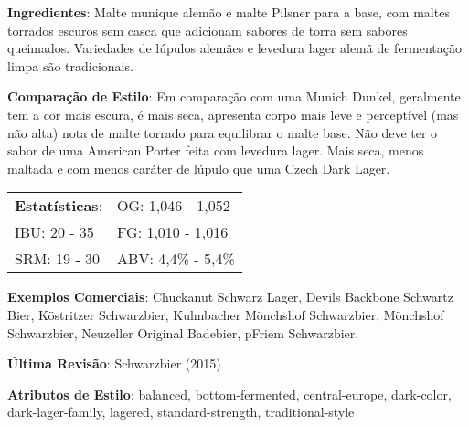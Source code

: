 \textbf{Ingredientes}: Malte munique alemão e malte Pilsner para a base, com maltes torrados escuros sem casca que adicionam sabores de torra sem sabores queimados. Variedades de lúpulos alemães e levedura lager alemã de fermentação limpa são tradicionais.

\textbf{Comparação de Estilo}: Em comparação com uma Munich Dunkel, geralmente tem a cor mais escura, é mais seca, apresenta corpo mais leve e perceptível (mas não alta) nota de malte torrado para equilibrar o malte base. Não deve ter o sabor de uma American Porter feita com levedura lager. Mais seca, menos maltada e com menos caráter de lúpulo que uma Czech Dark Lager.

\begin{tabular}{@{}p{35mm}p{35mm}@{}}
  \textbf{Estatísticas}: & OG: 1,046 - 1,052 \\
  IBU: 20 - 35 & FG: 1,010 - 1,016 \\
  SRM: 19 - 30 & ABV: 4,4\% - 5,4\%
\end{tabular}

\textbf{Exemplos Comerciais}: Chuckanut Schwarz Lager, Devils Backbone Schwartz Bier, Köstritzer Schwarzbier, Kulmbacher Mönchshof Schwarzbier, Mönchshof Schwarzbier, Neuzeller Original Badebier, pFriem Schwarzbier.

\textbf{Última Revisão}: Schwarzbier (2015)

\textbf{Atributos de Estilo}: balanced, bottom-fermented, central-europe, dark-color, dark-lager-family, lagered, standard-strength, traditional-style
